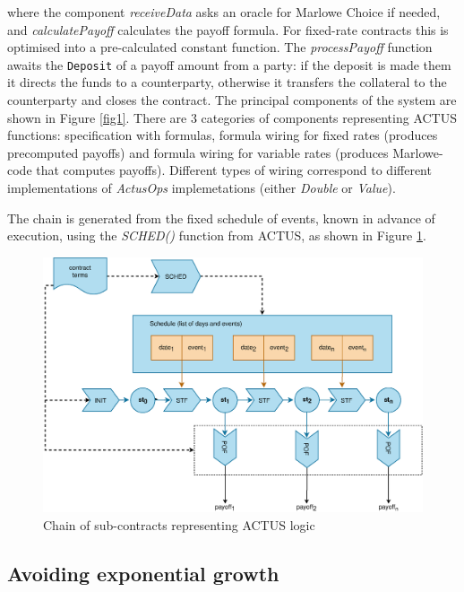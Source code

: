 \documentclass[runningheads]{llncs}
\newcommand{\ident}[1]{\mbox{\emph{#1}}}
\begin{document}
\noindent
where the component \emph{receiveData} asks an oracle for Marlowe Choice if needed, and
\mbox{\emph{calculatePayoff}} calculates the payoff formula. For fixed-rate contracts
this is optimised into a pre-calculated constant function. The \emph{processPayoff} function
awaits the \texttt{Deposit} of a payoff amount from a party: if the deposit is made them 
it directs the funds to a counterparty, otherwise it transfers
the collateral to the counterparty and closes the contract. The principal components of the system are shown in Figure \ref{fig1}. There are 3 categories of components representing ACTUS functions: specification with formulas, formula wiring for fixed rates (produces precomputed payoffs) and formula wiring for variable rates (produces Marlowe-code that computes payoffs). Different types of wiring correspond to different implementations of \emph{ActusOps} implemetations (either \emph{Double} or \emph{Value}). 

The chain
is generated from the fixed schedule of events, known in advance of execution, 
using the \ident{SCHED()} function from ACTUS, as shown in Figure \ref{fig2}.

\begin{figure}
\includegraphics[width=1\textwidth]{images/flowchart} \caption{Chain of sub-contracts representing ACTUS logic}
\label{fig2} 
\end{figure}


\subsection{Avoiding exponential growth }
\end{document}
